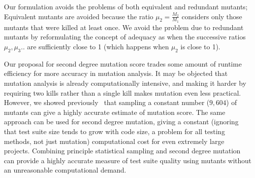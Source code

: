 \documentclass[conference]{IEEEtran}
\begin{document}
Our formulation avoids the problems of both equivalent and redundant mutants;
Equivalent mutants are avoided because the ratio $\mu_2 = \frac{M_2}{M_1}$
considers only those mutants that were killed at least once. We avoid the
problem due to redundant mutants by reformulating the concept of adequacy as
when the successive ratios $\mu_2, \mu_3 ..$ are
sufficiently close to 1 (which happens when $\mu_2$ is close to 1).

Our proposal for second degree mutation score trades some amount of runtime
efficiency for more accuracy in mutation analysis. It may be objected that mutation analysis
is already computationally intensive, and making it harder by requiring two kills rather than a
single kill makes mutation even less practical. However, we showed previously~\cite{gopinath2015howhard}
that sampling a constant number ($9,604$) of mutants can give a highly
accurate estimate of mutation score.  The same approach can be used
for second degree mutation, giving a constant (ignoring that test
suite size tends to grow with code size, a problem for all testing
methods, not just mutation) computational cost for even extremely
large projects.  Combining principle statistical sampling and second
degree mutation can provide a highly accurate measure of test suite
quality using mutants without an unreasonable computational demand.







 
\end{document}
